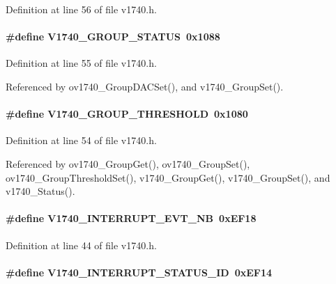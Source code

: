 Definition at line 56 of file v1740.h.
\paragraph[{V1740\_\-GROUP\_\-STATUS}]{\setlength{\rightskip}{0pt plus 5cm}\#define V1740\_\-GROUP\_\-STATUS~0x1088}\hfill\label{v1740_8h_a80627454e8b476f40c6f1566da1dff1a}


Definition at line 55 of file v1740.h.

Referenced by ov1740\_\-GroupDACSet(), and v1740\_\-GroupSet().
\paragraph[{V1740\_\-GROUP\_\-THRESHOLD}]{\setlength{\rightskip}{0pt plus 5cm}\#define V1740\_\-GROUP\_\-THRESHOLD~0x1080}\hfill\label{v1740_8h_ac2199d8641cea4d929a60d0e7164607f}


Definition at line 54 of file v1740.h.

Referenced by ov1740\_\-GroupGet(), ov1740\_\-GroupSet(), ov1740\_\-GroupThresholdSet(), v1740\_\-GroupGet(), v1740\_\-GroupSet(), and v1740\_\-Status().
\paragraph[{V1740\_\-INTERRUPT\_\-EVT\_\-NB}]{\setlength{\rightskip}{0pt plus 5cm}\#define V1740\_\-INTERRUPT\_\-EVT\_\-NB~0xEF18}\hfill\label{v1740_8h_acb413f9f8acbbab71c4757972bd7264d}


Definition at line 44 of file v1740.h.
\paragraph[{V1740\_\-INTERRUPT\_\-STATUS\_\-ID}]{\setlength{\rightskip}{0pt plus 5cm}\#define V1740\_\-INTERRUPT\_\-STATUS\_\-ID~0xEF14}\hfill\label{v1740_8h_a09bcc2aadf88a28ed4d24aa1e9d9ed1a}


